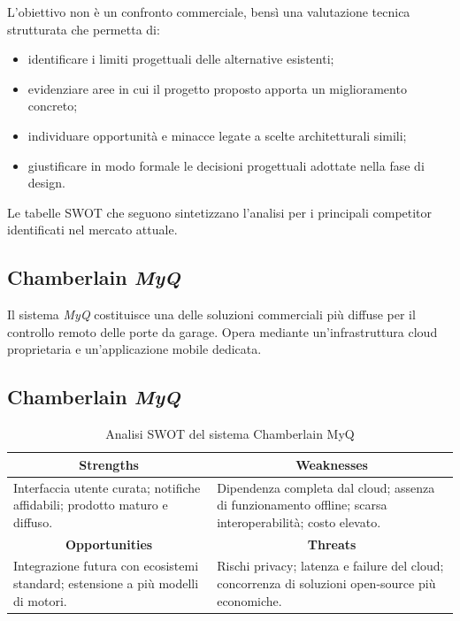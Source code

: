 L’obiettivo non è un confronto commerciale, bensì una valutazione tecnica strutturata che permetta di:
\begin{itemize}
    \item identificare i limiti progettuali delle alternative esistenti;
    \item evidenziare aree in cui il progetto proposto apporta un miglioramento concreto;
    \item individuare opportunità e minacce legate a scelte architetturali simili;
    \item giustificare in modo formale le decisioni progettuali adottate nella fase di design.
\end{itemize}

Le tabelle SWOT che seguono sintetizzano l’analisi per i principali competitor identificati nel mercato attuale.


\subsection{Chamberlain \textit{MyQ}}
Il sistema \textit{MyQ} costituisce una delle soluzioni commerciali più diffuse per il controllo remoto delle porte da garage. Opera mediante un'infrastruttura cloud proprietaria e un'applicazione mobile dedicata.
\subsection{Chamberlain \textit{MyQ}}

\begin{table}[h!]
\centering
\caption{Analisi SWOT del sistema Chamberlain MyQ}
\label{tab:swot_myq}
\renewcommand{\arraystretch}{1.4}

\begin{tabular}{|p{}|p{}|}
\hline
\multicolumn{1}{|c|}{\textbf{Strengths}} & 
\multicolumn{1}{c|}{\textbf{Weaknesses}} \\
\hline
Interfaccia utente curata; notifiche affidabili; prodotto maturo e diffuso. &
Dipendenza completa dal cloud; assenza di funzionamento offline; scarsa interoperabilità; costo elevato. \\
\hline

\multicolumn{1}{|c|}{\textbf{Opportunities}} &
\multicolumn{1}{c|}{\textbf{Threats}} \\
\hline
Integrazione futura con ecosistemi standard; estensione a più modelli di motori. &
Rischi privacy; latenza e failure del cloud; concorrenza di soluzioni open-source più economiche. \\
\hline
\end{tabular}

\end{table}


